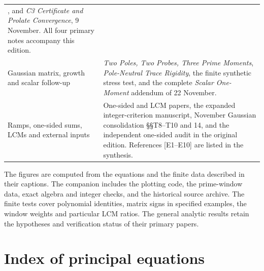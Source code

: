 \documentclass[
  10pt,
  a4paper,
  10pt,
  oneside,
  openany]{book}
\begin{document}
\begin{longtable}[]{@{}
  >{\raggedright\arraybackslash}p{}
  >{\raggedright\arraybackslash}p{}@{}}
{Energy Continuation}, and \emph{C3 Certificate and Prolate Convergence},
9 November. All four primary notes accompany this edition. \\
Gaussian matrix, growth and scalar follow-up & \emph{Two Poles, Two
Probes, Three Prime Moments}, \emph{Pole-Neutral Trace Rigidity}, the
finite synthetic stress test, and the complete \emph{Scalar One-Moment}
addendum of 22 November. \\
Ramps, one-sided sums, LCMs and external inputs & One-sided and LCM
papers, the expanded integer-criterion manuscript, November Gaussian
consolidation §§T8--T10 and 14, and the independent one-sided audit in
the original edition. References {[}E1--E10{]} are listed in the
synthesis. \\
\end{longtable}

The figures are computed from the equations and the finite data
described in their captions. The companion includes the plotting code,
the prime-window data, exact algebra and integer checks, and the
historical source archive. The finite tests cover polynomial identities,
matrix signs in specified examples, the window weights and particular
LCM ratios. The general analytic results retain the hypotheses and
verification status of their primary papers.

\section{Index of principal equations}\label{atlas-locator}
\end{document}
